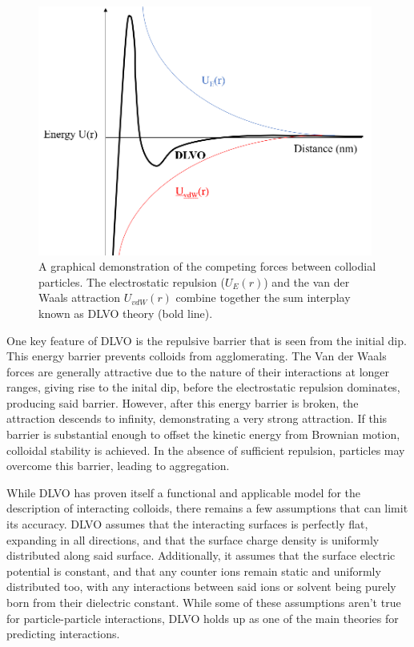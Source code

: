 \begin{figure}[h]     %
        \begin{center}
          \includegraphics[width=110mm]{chapter1/DLVO.PNG}
\end{center}
\caption{A graphical demonstration of the competing forces between collodial particles. The electrostatic repulsion ($U_E(r)$) and the van der Waals attraction $U_{vdW}(r)$ combine together the sum interplay known as DLVO theory (bold line).}
\label{fig:DLVO}                 %
\end{figure}

One key feature of DLVO is the repulsive barrier that is seen from the initial dip. This energy barrier prevents colloids from agglomerating. The Van der Waals forces are generally attractive due to the nature of their interactions at longer ranges, giving rise to the inital dip, before the electrostatic repulsion dominates, producing said barrier. However, after this energy barrier is broken, the attraction descends to infinity, demonstrating a very strong attraction. If this barrier is substantial enough to offset the kinetic energy from Brownian motion, colloidal stability is achieved. In the absence of sufficient repulsion, particles may overcome this barrier, leading to aggregation.

While DLVO has proven itself a functional and applicable model for the description of interacting colloids, there remains a few assumptions that can limit its accuracy. DLVO assumes that the interacting surfaces is perfectly flat, expanding in all directions, and that the surface charge density is uniformly distributed along said surface. Additionally, it assumes that the surface electric potential is constant, and that any counter ions remain static and uniformly distributed too, with any interactions between said ions or solvent being purely born from their dielectric constant. While some of these assumptions aren't true for particle-particle interactions, DLVO holds up as one of the main theories for predicting interactions. \cite{particledep} \cite{effectHetSurf} \cite{colloidDepKin} \cite{chemDiscCharge} \cite{DLVOreview} 

